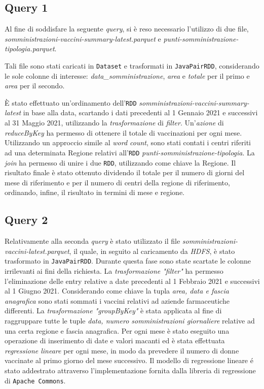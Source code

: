 \documentclass[conference]{IEEEtran}
\begin{document}
\subsection*{\textbf{Query 1}}
Al fine di soddisfare la seguente \emph{query}, si \`{e} reso necessario l'utilizzo di due file, \textit{somministrazioni-vaccini-summary-latest.parquet} e \textit{punti-somministrazione-tipologia.parquet}.\par
Tali file sono stati caricati in \texttt{Dataset} e trasformati in \texttt{JavaPairRDD}, considerando le sole colonne di interesse: \emph{data\_somministrazione}, \emph{area} e \emph{totale} per il primo e \emph{area} per il secondo.\par \`{E} stato effettuato un'ordinamento dell'\texttt{RDD} \textit{somministrazioni-vaccini-summary-latest} in base alla data, scartando i dati precedenti al 1 Gennaio 2021 e successivi al 31 Maggio 2021, utilizzando la \emph{trasformazione} di \emph{filter}. Un'\emph{azione} di \emph{reduceByKey} ha permesso di ottenere il totale di vaccinazioni per ogni mese. Utilizzando un approccio simile al \emph{word count}, sono stati contati i centri riferiti ad una determinata Regione relativi all'\texttt{RDD} \textit{punti-somministrazione-tipologia}. La \emph{join} ha permesso di unire i due \texttt{RDD}, utilizzando come chiave la Regione. Il risultato finale \`{e} stato ottenuto dividendo il totale per il numero di giorni del mese di riferimento e per il numero di centri della regione di riferimento, ordinando, infine, il risultato in termini di mese e regione.

\subsection*{\textbf{Query 2}}
Relativamente alla seconda \emph{query} \`{e} stato utilizzato il file \textit{somministrazioni-vaccini-latest.parquet}, il quale, in seguito al caricamento da \emph{HDFS}, \`{e} stato trasformato in \texttt{JavaPairRDD}. Durante questa fase sono state scartate le colonne irrilevanti ai fini della richiesta. La \emph{trasformazione "filter"} ha permesso l'eliminazione delle entry relative a date precedenti al 1 Febbraio 2021 e successivi al 1 Giugno 2021. Considerando come chiave la tupla \emph{area, data e fascia anagrafica} sono stati sommati i vaccini relativi ad aziende farmaceutiche differenti. La \emph{trasformazione "groupByKey"} \`{e} stata applicata al fine di raggruppare tutte le tuple \emph{data, numero somministrazioni giornaliere} relative ad una certa regione e fascia anagrafica. Per ogni mese \`{e} stato eseguito una operazione di inserimento di date e valori macanti ed \`{e} stata effettuata \emph{regressione lineare} per ogni mese, in modo da prevedere il numero di donne vaccinate al primo giorno del mese successivo. Il modello di regressione lineare \'{e} stato addestrato attraverso l'implementazione fornita dalla libreria di regressione di \texttt{Apache Commons}.
\end{document}
